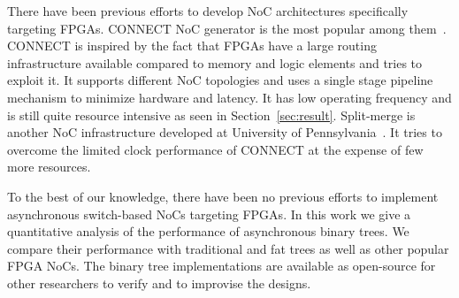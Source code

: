 There have been previous efforts to develop NoC architectures specifically targeting FPGAs.
CONNECT NoC generator is the most popular among them~\cite{papa_connect_fpga2012}.
CONNECT is inspired by the fact that FPGAs have a large routing infrastructure available compared to memory and logic elements and tries to exploit it. 
It supports different NoC topologies and uses a single stage pipeline mechanism  to minimize hardware and latency. 
It has low operating frequency and is still quite resource intensive as seen in Section~\ref{sec:result}. 
Split-merge is another NoC infrastructure developed at University of Pennsylvania~\cite{Huan2012}.
It tries to overcome the limited clock performance of CONNECT at the expense of few more resources.

To the best of our knowledge, there have been no previous efforts to implement asynchronous switch-based NoCs targeting FPGAs. 
In this work we give a quantitative analysis of the performance of asynchronous binary trees.
We compare their performance with traditional and fat trees as well as other popular FPGA NoCs.
The binary tree implementations are available as open-source for other researchers to verify and to improvise the designs.